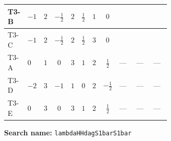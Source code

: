 \documentclass[8pt]{article}
\begin{document}
\begin{landscape}
\begin{longtable}{@{}llcccccc >{\raggedright\arraybackslash}p{0.21\linewidth} >{\raggedright\arraybackslash}p{0.21\linewidth} >{\raggedright\arraybackslash}p{0.21\linewidth}@{}}
T3-B & $-1$ & $2$ & $-\frac{1}{2}$ & $2$ & $\frac{1}{2}$ & $1$ & $0$ & \scriptsize\adjustbox{max width=\linewidth}{$\begin{gathered} {\lambda_{H^\dagger H^\dagger S_1^\dagger S_1^\dagger}} (6 \operatorname{Tr}\!\left({Y_d}\,\left({Y_d}\right)^{\dagger}\right)+2 \operatorname{Tr}\!\left({Y_e}\,\left({Y_e}\right)^{\dagger}\right)+6 \operatorname{Tr}\!\left({Y_u}\,\left({Y_u}\right)^{\dagger}\right))\end{gathered}$} & \scriptsize\adjustbox{max width=\linewidth}{$\begin{gathered} -2 {\lambda_{H H^\dagger S_1^\dagger S_2^\dagger}^{\rm Cross}} \left({\lambda_{T3}}\right)^{*}\end{gathered}$} & \scriptsize\adjustbox{max width=\linewidth}{$\begin{gathered} +2 {\lambda_{S_1 S_1^{\dagger 2}S_2^\dagger}} \left({\lambda_{T3}}\right)^{*}\end{gathered}$} \\
\midrule
T3-C & $-1$ & $2$ & $-\frac{1}{2}$ & $2$ & $\frac{1}{2}$ & $3$ & $0$ & \scriptsize\adjustbox{max width=\linewidth}{$\begin{gathered} {\lambda_{H^\dagger H^\dagger S_1^\dagger S_1^\dagger}} (6 \operatorname{Tr}\!\left({Y_d}\,\left({Y_d}\right)^{\dagger}\right)+2 \operatorname{Tr}\!\left({Y_e}\,\left({Y_e}\right)^{\dagger}\right)+6 \operatorname{Tr}\!\left({Y_u}\,\left({Y_u}\right)^{\dagger}\right))\end{gathered}$} & \scriptsize\adjustbox{max width=\linewidth}{$\begin{gathered} -2 {\lambda_{H H^\dagger S_1^\dagger S_2^\dagger}^{\rm Cross}} \left({\lambda_{T3}}\right)^{*}\end{gathered}$} & \scriptsize\adjustbox{max width=\linewidth}{$\begin{gathered} +2 {\lambda_{S_1 S_1^{\dagger 2}S_2^\dagger}} \left({\lambda_{T3}}\right)^{*}\end{gathered}$} \\
\midrule
T3-A & $0$ & $1$ & $0$ & $3$ & $1$ & $2$ & $\frac{1}{2}$ & --- & --- & --- \\
\midrule
T3-D & $-2$ & $3$ & $-1$ & $1$ & $0$ & $2$ & $-\frac{1}{2}$ & --- & --- & --- \\
\midrule
T3-E & $0$ & $3$ & $0$ & $3$ & $1$ & $2$ & $\frac{1}{2}$ & --- & --- & --- \\
\midrule
\bottomrule
\end{longtable}
\clearpage
\noindent\textbf{Search name: }\texttt{lambdaHHdagS1barS1bar}\par\smallskip

\end{landscape}
\end{document}
